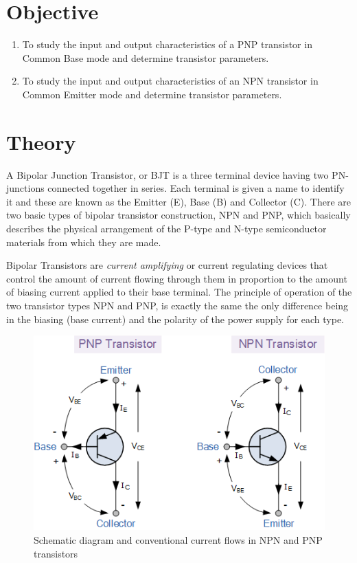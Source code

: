 
\section{Objective}

\begin{enumerate}[label=(\roman*)]
    \item To study the input and output characteristics of a PNP transistor in Common Base mode and determine transistor parameters.
    \item To study the input and output characteristics of an NPN transistor in Common Emitter mode and determine transistor parameters.
\end{enumerate}

\section{Theory}

A Bipolar Junction Transistor, or BJT is a three terminal device having two PN-junctions connected together in series. Each terminal is given a name to identify it and these are known as the Emitter (E), Base (B) and Collector (C). There are two basic types of bipolar transistor
construction, NPN and PNP, which basically describes the physical arrangement of the P-type and N-type semiconductor materials from which they are made. 

Bipolar Transistors are \textit{current amplifying} or current regulating devices that control the amount of current flowing through them in proportion to the amount of biasing current applied to their base terminal. The principle of operation of the two transistor types NPN and PNP, is exactly the same the only difference being in the biasing (base current) and the polarity of the power supply for each type.

\begin{figure}[H]
    \centering
    \includegraphics[width=.9\columnwidth]{images/f1.jpg}
    \caption{Schematic diagram and conventional current flows in NPN and PNP transistors}
        \label{fig:3}
\end{figure}

